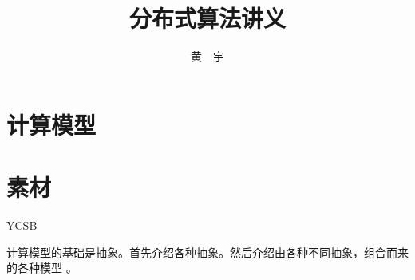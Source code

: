 \documentclass[UTF8]{ctexrep}
\begin{document}
\title{\bf 分布式算法讲义}

\author{黄\ \ 宇}

\maketitle

\tableofcontents


\chapter{计算模型}



\chapter*{素材}


YCSB \cite{Cooper10, YCSB-github}

计算模型的基础是抽象。首先介绍各种抽象。然后介绍由各种不同抽象，组合而来的各种模型 \cite{Cachin11}。






\end{document}
